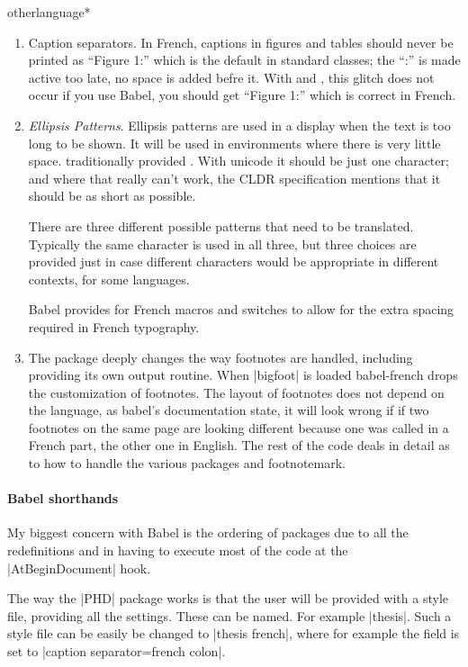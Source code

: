 \begin{docCommandd}{otherlanguage*} { }
\begin{enumerate}
       \item Caption separators. In French, captions in figures and tables should never be printed as \enquote{Figure 1:} which is the default in standard \latexe classes; the \enquote{:} is made active too late, no space is added befre it. With \lualatex and \xelatex, this glitch does not occur if you use Babel, you should get \enquote{Figure 1\thinspace:} which is correct in French. 
       \item \textit{Ellipsis Patterns}.  Ellipsis patterns are used in a display when the text is too long to be shown. It will be used in environments where there is very little space. \tex traditionally provided . With unicode it should be just one character; and where that really can't work, the CLDR specification mentions that it should be as short as possible. 

There are three different possible patterns that need to be translated. Typically the same character is used in all three, but three choices are provided just in case different characters would be appropriate in different contexts, for some languages.

       Babel provides for French macros and switches to allow for the extra spacing required in French typography.

       \item The  package deeply changes the way footnotes are handled, including providing its own output routine. When |bigfoot| is loaded babel-french drops the customization of footnotes. The layout of footnotes does not depend on the language, as babel's documentation state, it will look wrong if if two footnotes on the same page are looking different because one was called in a French part, the other one in English.  The rest of the code deals in detail as to how to handle the various
       packages and footnotemark.  
     \end{enumerate}
   
   
\paragraph{Babel shorthands}      
My biggest concern with Babel is the ordering of packages due to all the redefinitions and in having to execute most of the code at the |AtBeginDocument| hook.      
    
The way the |PHD| package works is that the user will be provided with a style file, providing all the settings. These can be named. For example |thesis|. Such a style file can be easily be changed to |thesis french|, where for example the field  is set to |caption separator=french colon|.     


\end{docCommandd}
